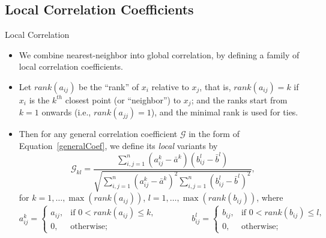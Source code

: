 \documentclass{beamer}
\newcommand{\G}{\mathcal{G}}
\begin{document}
\subsection{Local Correlation Coefficients}
\begin{frame}{Local Correlation}
\begin{itemize}[<+->]
\item We combine nearest-neighbor into global correlation, by defining a family of local correlation coefficients.
\item Let $rank(a_{ij})$  be the ``rank'' of $x_i$ relative to $x_j$, that is, $rank(a_{ij})=k$ if $x_i$ is the $k^{th}$ closest point (or ``neighbor'') to $x_j$; and the ranks start from $k=1$ onwards (i.e., $rank(a_{jj})=1$), and the minimal rank is used for ties. 
\item Then for any general correlation coefficient $\G$ in the form of Equation~\ref{generalCoef}, we define its \emph{local} variants by
\begin{equation}
\label{localCoef}
\G_{kl}=\frac{\sum_{i,j=1}^n (a_{ij}^k-\bar{a}^{k}) (b_{ij}^l-\bar{b}^{l})}{\sqrt{\sum_{i,j=1}^n  (a_{ij}^{k}-\bar{a}^{k})^2 \sum_{i,j=1}^n (b_{ij}^{l}-\bar{b}^{l})^2}},
\end{equation}
for $k=1,\ldots,\max(rank(a_{ij}))$, $l=1,\ldots,\max(rank(b_{ij}))$, where
\begin{equation}
\label{localCoef2}
    a_{ij}^k=
    \begin{cases}
      a_{ij}, & \text{if } 0 < rank(a_{ij}) \leq k, \\
      0, & \text{otherwise};
    \end{cases} \qquad \qquad
    b_{ij}^l=
    \begin{cases}
      b_{ij}, & \text{if } 0 < rank(b_{ij}) \leq l, \\
      0, & \text{otherwise};
    \end{cases}
\end{equation}
\end{itemize}
\end{frame}
\end{document}
